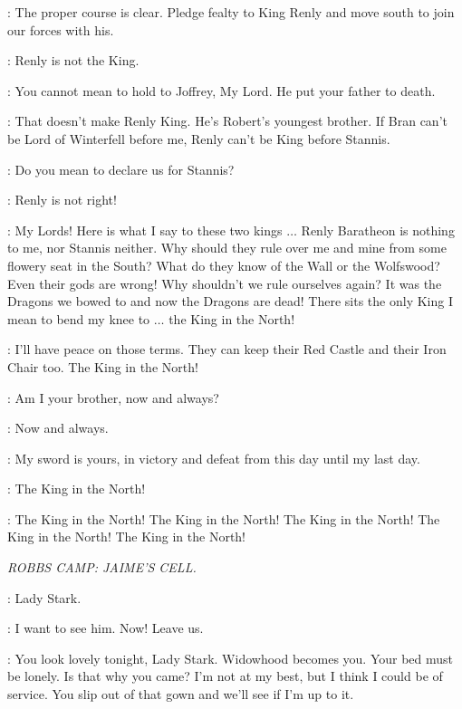 
\GLOVER: The proper course is clear. Pledge fealty to King Renly and move south to join our forces with his. 

\ROBB: Renly is not the King. 

\GLOVER: You cannot mean to hold to Joffrey, My Lord. He put your father to death. 

\ROBB: That doesn't make Renly King. He's Robert's youngest brother. If Bran can't be Lord of Winterfell before me, Renly can't be King before Stannis. 

\GLOVER: Do you mean to declare us for Stannis? 

\BRACKEN: Renly is not right! 

\UMBER: My Lords! Here is what I say to these two kings $\ldots$  Renly Baratheon is nothing to me, nor Stannis neither. Why should they rule over me and mine from some flowery seat in the South? What do they know of the Wall or the Wolfswood? Even their gods are wrong! Why shouldn't we rule ourselves again? It was the Dragons we bowed to and now the Dragons are dead! There sits the only King I mean to bend my knee to $\ldots$ the King in the North! 

\BRACKEN: I'll have peace on those terms. They can keep their Red Castle and their Iron Chair too. The King in the North! 

\THEON: Am I your brother, now and always? 

\ROBB: Now and always. 

\THEON: My sword is yours, in victory and defeat from this day until my last day. 

\UMBER: The King in the North! 

\CROWD: The King in the North! The King in the North! The King in the North! The King in the North! The King in the North! 


\scene

\textit{ROBBS CAMP: JAIME'S CELL.}


\GUARD: Lady Stark. 

\CATELYN: I want to see him. Now! Leave us. 

\JAIME: You look lovely tonight, Lady Stark. Widowhood becomes you. Your bed must be lonely. Is that why you came? I'm not at my best, but I think I could be of service. You slip out of that gown and we'll see if I'm up to it. 

